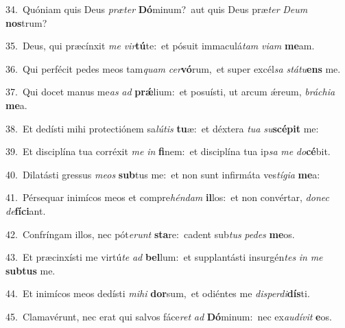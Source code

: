 {\numbfont\textcolor{\numbcolor}{34.}}~Quóniam quis Deus \textit{præ}\-\textit{ter} \textbf{Dó}\-minum?~\star aut quis Deus præ\textit{ter} \textit{De}\-\textit{um} \textbf{nos}\-trum?\par
{\numbfont\textcolor{\numbcolor}{35.}}~Deus, qui præcínxit \textit{me} \textit{vir}\-\textbf{tú}te:~\star et pósuit immaculá\textit{tam} \textit{vi}\-\textit{am} \textbf{me}\-am.\par
{\numbfont\textcolor{\numbcolor}{36.}}~Qui perfécit pedes meos tam\textit{quam} \textit{cer}\-\textbf{vó}rum,~\star et super excél\textit{sa} \textit{stá}\-\textit{tu}\textbf{ens} me.\par
{\numbfont\textcolor{\numbcolor}{37.}}~Qui docet manus me\textit{as} \textit{ad} \textbf{prǽ}\-lium:~\star et posuísti, ut arcum ǽreum, \textit{brá}\-\textit{chi}\textit{a} \textbf{me}\-a.\par
{\numbfont\textcolor{\numbcolor}{38.}}~Et dedísti mihi protectiónem sa\-\textit{lú}\-\textit{tis} \textbf{tu}\-æ:~\star et déxtera \textit{tu}\-\textit{a} \textit{su}\-\textbf{scé}\textbf{pit} me:\par
{\numbfont\textcolor{\numbcolor}{39.}}~Et disciplína tua corréxit \textit{me} \textit{in} \textbf{fi}\-nem:~\star et disciplína tua ip\textit{sa} \textit{me} \textit{do}\-\textbf{cé}bit.\par
{\numbfont\textcolor{\numbcolor}{40.}}~Dilatásti gressus \textit{me}\-\textit{os} \textbf{sub}\-tus me:~\star et non sunt infirmáta ves\-\textit{tí}\-\textit{gi}\textit{a} \textbf{me}\-a:\par
{\numbfont\textcolor{\numbcolor}{41.}}~Pérsequar inimícos meos et compre\-\textit{hén}\-\textit{dam} \textbf{il}\-los:~\star et non convértar, \textit{do}\-\textit{nec} \textit{de}\-\textbf{fí}\textbf{ci}ant.\par
{\numbfont\textcolor{\numbcolor}{42.}}~Confríngam illos, nec pót\-\textit{e}\-\textit{runt} \textbf{sta}\-re:~\star cadent sub\textit{tus} \textit{pe}\-\textit{des} \textbf{me}\-os.\par
{\numbfont\textcolor{\numbcolor}{43.}}~Et præcinxísti me virtú\textit{te} \textit{ad} \textbf{bel}\-lum:~\star et supplantásti insurgén\textit{tes} \textit{in} \textit{me} \textbf{sub}\-\textbf{tus} me.\par
{\numbfont\textcolor{\numbcolor}{44.}}~Et inimícos meos dedísti \textit{mi}\-\textit{hi} \textbf{dor}\-sum,~\star et odiéntes me \textit{dis}\-\textit{per}\textit{di}\textbf{dís}ti.\par
{\numbfont\textcolor{\numbcolor}{45.}}~Clamavérunt, nec erat qui salvos fáce\textit{ret} \textit{ad} \textbf{Dó}\-minum:~\star nec ex\-\textit{au}\-\textit{dí}\textit{vit} \textbf{e}\-os.\par

